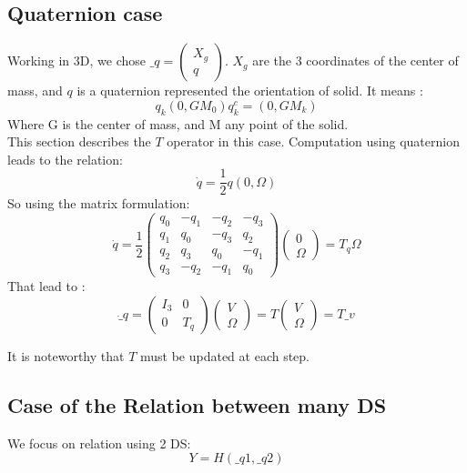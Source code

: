 \subsection{Quaternion case}
Working in 3D, we chose $\_q= \left(\begin{array}{l} X_g \\q \end{array}\right) $. $X_g$ are the 3 coordinates of the center of mass, and $q$ is a quaternion
  represented the orientation of solid. It means :
  \[q_k(0,GM_0)q_k^c = (0,GM_k)\]
Where G is the center of mass, and M any point of the solid.\\
This section describes the $T$ operator in this case. Computation using quaternion leads to the relation:
\[\dot q = \frac{1}{2} q (0,\Omega)\]
So using the matrix formulation:
\[\dot q = \frac{1}{2}  \left(\begin{array}{cccc} q_0&-q_1&-q_2&-q_3 \\ q_1&q_0&-q_3&q_2\\
  q_2&q_3&q_0&-q_1\\ q_3&-q_2&-q_1&q_0\end{array}\right)  \left(\begin{array}{c} 0 \\ \Omega
  \end{array}\right) =
  T_q   \Omega  \]
  That lead to :
  \[ \dot \_q = \left(\begin{array}{cc} I_3 & 0 \\ 0 &
  T_q \end{array}\right) \left(\begin{array}{c} V\\ \Omega  \end{array}\right)  = T
  \left(\begin{array}{c} V\\ \Omega  \end{array}\right)=T \_v\]

It is noteworthy that $T$ must be updated at each step.


\subsection{Case of the Relation between many DS}
We focus on relation using 2 DS:
\[Y=H(\_q1,\_q2)\]
